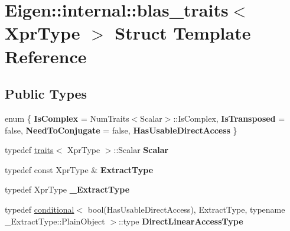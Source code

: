 \hypertarget{struct_eigen_1_1internal_1_1blas__traits}{}\section{Eigen\+::internal\+::blas\+\_\+traits$<$ Xpr\+Type $>$ Struct Template Reference}
\label{struct_eigen_1_1internal_1_1blas__traits}
\subsection*{Public Types}
\begin{DoxyCompactItemize}
\item 
\mbox{\label{struct_eigen_1_1internal_1_1blas__traits_a6ba047b48d1e76dbfae2c8830308eeec}} 
enum \{ {\bfseries Is\+Complex} = Num\+Traits$<$Scalar$>$\+::Is\+Complex, 
{\bfseries Is\+Transposed} = false, 
{\bfseries Need\+To\+Conjugate} = false, 
{\bfseries Has\+Usable\+Direct\+Access}
 \}
\item 
\mbox{\label{struct_eigen_1_1internal_1_1blas__traits_ac5b1b5ec7dfe61418c561674e47a5cdd}} 
typedef \mbox{\hyperlink{struct_eigen_1_1internal_1_1traits}{traits}}$<$ Xpr\+Type $>$\+::Scalar {\bfseries Scalar}
\item 
\mbox{\label{struct_eigen_1_1internal_1_1blas__traits_a63b33a3d263ccd7709cb758a560ab5b6}} 
typedef const Xpr\+Type \& {\bfseries Extract\+Type}
\item 
\mbox{\label{struct_eigen_1_1internal_1_1blas__traits_ada873c310e824caadb8bd690cac37316}} 
typedef Xpr\+Type {\bfseries \+\_\+\+Extract\+Type}
\item 
\mbox{\label{struct_eigen_1_1internal_1_1blas__traits_a6c3057fb89fc7a4257c3b06e9931438f}} 
typedef \mbox{\hyperlink{struct_eigen_1_1internal_1_1conditional}{conditional}}$<$ bool(Has\+Usable\+Direct\+Access), Extract\+Type, typename \+\_\+\+Extract\+Type\+::\+Plain\+Object $>$\+::type {\bfseries Direct\+Linear\+Access\+Type}
\end{DoxyCompactItemize}
